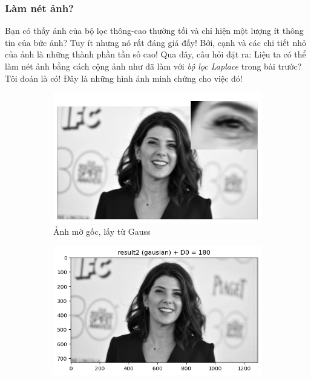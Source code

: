 \documentclass{article}
\begin{document}
        \subsubsection{Làm nét ảnh?}
        Bạn có thấy ảnh của bộ lọc thông-cao thường tối và chỉ hiện một lượng ít thông tin của bức ảnh? Tuy ít nhưng nó rất đáng giá đấy! Bởi, cạnh và các chi tiết nhỏ của ảnh là những thành phần tần số cao! Qua đây, câu hỏi đặt ra: Liệu ta có thể làm nét ảnh bằng cách cộng ảnh như đã làm với \textit{bộ lọc Laplace} trong bài trước? Tôi đoán là có! Đây là những hình ảnh minh chứng cho việc đó!
        \begin{figure}[ht!]
            \centering
            \begin{subfigure}[b]{0.7\linewidth}
                \includegraphics[width=\linewidth]{fo24a.png}
                \caption{Ảnh mờ gốc, lấy từ Gauss}
            \end{subfigure}
            \begin{subfigure}[b]{0.45\linewidth}
                \includegraphics[width = \linewidth]{fo24b.png}

\end{subfigure}
\end{figure}
\end{document}
